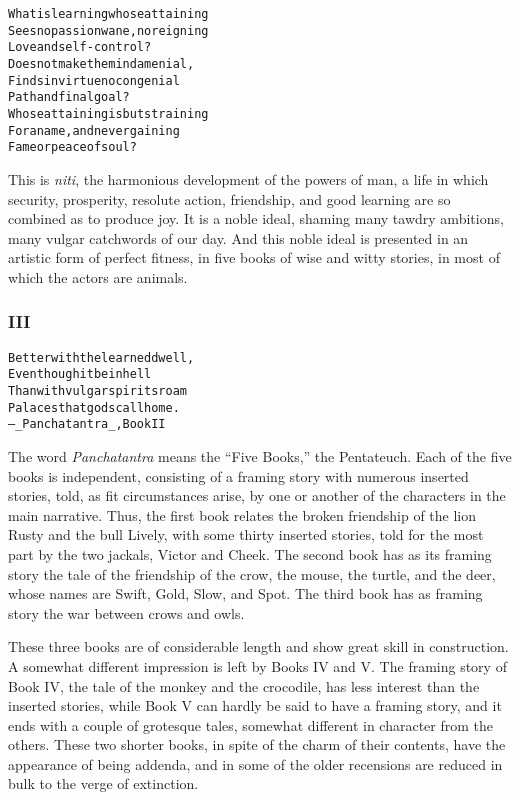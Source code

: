 \documentclass{article}
\renewenvironment{verbatim}{\begin{alltt}\normalfont\begin{centering}}{\end{centering}\end{alltt}}
\begin{document}
\begin{verbatim}
What is learning whose attaining
Sees no passion wane, no reigning
    Love and self-control?
Does not make the mind a menial,
Finds in virtue no congenial
    Path and final goal?
Whose attaining is but straining
For a name, and never gaining
    Fame or peace of soul?
\end{verbatim}
This is \emph{niti}, the harmonious development of the powers of
man, a life in which security, prosperity, resolute action,
friendship, and good learning are so combined as to produce joy. It
is a noble ideal, shaming many tawdry ambitions, many vulgar
catchwords of our day. And this noble ideal is presented in an
artistic form of perfect fitness, in five books of wise and witty
stories, in most of which the actors are animals.

\subsubsection{III}

\begin{verbatim}
Better with the learned dwell,
Even though it be in hell
Than with vulgar spirits roam
Palaces that gods call home.
        --_Panchatantra_, Book II
\end{verbatim}
The word \emph{Panchatantra} means the ``Five Books,'' the
Pentateuch. Each of the five books is independent, consisting of a
framing story with numerous inserted stories, told, as fit
circumstances arise, by one or another of the characters in the
main narrative. Thus, the first book relates the broken friendship
of the lion Rusty and the bull Lively, with some thirty inserted
stories, told for the most part by the two jackals, Victor and
Cheek. The second book has as its framing story the tale of the
friendship of the crow, the mouse, the turtle, and the deer, whose
names are Swift, Gold, Slow, and Spot. The third book has as
framing story the war between crows and owls.

These three books are of considerable length and show great skill
in construction. A somewhat different impression is left by Books
IV and V. The framing story of Book IV, the tale of the monkey and
the crocodile, has less interest than the inserted stories, while
Book V can hardly be said to have a framing story, and it ends with
a couple of grotesque tales, somewhat different in character from
the others. These two shorter books, in spite of the charm of their
contents, have the appearance of being addenda, and in some of the
older recensions are reduced in bulk to the verge of extinction.
\end{document}
